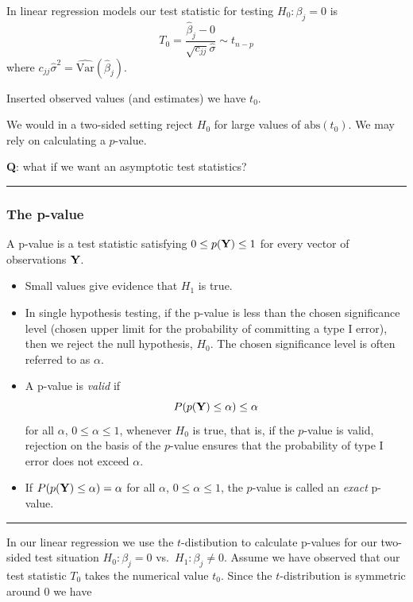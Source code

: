 \documentclass[
]{article}
\providecommand{\tightlist}{%
  \setlength{\itemsep}{0pt}\setlength{\parskip}{0pt}}
\begin{document}
In linear regression models our test statistic for testing
\(H_0: \beta_j=0\) is
\[T_0=\frac{\hat{\beta}_j-0}{\sqrt{c_{jj}}\hat{\sigma}}\sim t_{n-p}\]
where \(c_{jj}\hat{\sigma}^2=\widehat{\text{Var}}(\hat{\beta}_j)\).

Inserted observed values (and estimates) we have \(t_0\).

We would in a two-sided setting reject \(H_0\) for large values of
\(\text{abs}(t_0)\). We may rely on calculating a \(p\)-value.

\textbf{Q}: what if we want an asymptotic test statistics?

\begin{center}\rule{0.5\linewidth}{0.5pt}\end{center}

\hypertarget{the-p-value}{%
\subsubsection{The p-value}\label{the-p-value}}

A p-value is a test statistic satisfying \(0 \leq p({\bf Y}) \leq 1\)
for every vector of observations \({\bf Y}\).

\begin{itemize}
\tightlist
\item
  Small values give evidence that \(H_1\) is true.
\item
  In single hypothesis testing, if the p-value is less than the chosen
  significance level (chosen upper limit for the probability of
  committing a type I error), then we reject the null hypothesis,
  \(H_0\). The chosen significance level is often referred to as
  \(\alpha\).
\item
  A p-value is \emph{valid} if
  \[ P(p({\bf Y}) \leq \alpha) \leq \alpha\] for all \(\alpha\),
  \(0 \leq \alpha \leq 1\), whenever \(H_0\) is true, that is, if the
  \(p\)-value is valid, rejection on the basis of the \(p\)-value
  ensures that the probability of type I error does not exceed
  \(\alpha\).
\item
  If \(P(p({\bf Y}) \leq \alpha) = \alpha\) for all \(\alpha\),
  \(0 \leq \alpha \leq 1\), the \(p\)-value is called an \emph{exact}
  p-value.
\end{itemize}

\begin{center}\rule{0.5\linewidth}{0.5pt}\end{center}

In our linear regression we use the \(t\)-distibution to calculate
p-values for our two-sided test situation \(H_0: \beta_j=0\)
vs.~\(H_1: \beta_j \neq 0\). Assume we have observed that our test
statistic \(T_0\) takes the numerical value \(t_0\). Since the
\(t\)-distribution is symmetric around \(0\) we have
\end{document}
